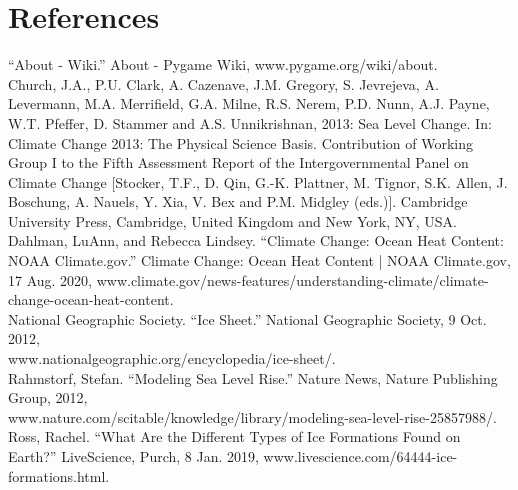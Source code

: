\documentclass[fontsize=11pt]{article}
\begin{document}
\section*{References}

“About - Wiki.” About - Pygame Wiki, www.pygame.org/wiki/about.\\

Church, J.A., P.U. Clark, A. Cazenave, J.M. Gregory, S. Jevrejeva, A. Levermann, M.A. Merrifield, G.A. Milne, R.S. Nerem, P.D. Nunn, A.J. Payne, W.T. Pfeffer, D. Stammer and A.S. Unnikrishnan, 2013: Sea Level Change. In: Climate Change 2013: The Physical Science Basis. Contribution of Working Group I to the Fifth Assessment Report of the Intergovernmental Panel on Climate Change [Stocker, T.F., D. Qin, G.-K. Plattner, M. Tignor, S.K. Allen, J. Boschung, A. Nauels, Y. Xia, V. Bex and P.M. Midgley (eds.)]. Cambridge University Press, Cambridge, United Kingdom and New York, NY, USA.\\

Dahlman, LuAnn, and Rebecca Lindsey. “Climate Change: Ocean Heat Content: NOAA Climate.gov.” Climate Change: Ocean Heat Content | NOAA Climate.gov, 17 Aug. 2020, www.climate.gov/news-features/understanding-climate/climate-change-ocean-heat-content.\\

National Geographic Society. “Ice Sheet.” National Geographic Society, 9 Oct. 2012,\\ www.nationalgeographic.org/encyclopedia/ice-sheet/.\\

Rahmstorf, Stefan. “Modeling Sea Level Rise.” Nature News, Nature Publishing Group, 2012,\\ www.nature.com/scitable/knowledge/library/modeling-sea-level-rise-25857988/.\\

Ross, Rachel. “What Are the Different Types of Ice Formations Found on Earth?” LiveScience, Purch, 8 Jan. 2019, www.livescience.com/64444-ice-formations.html.\\
\end{document}
